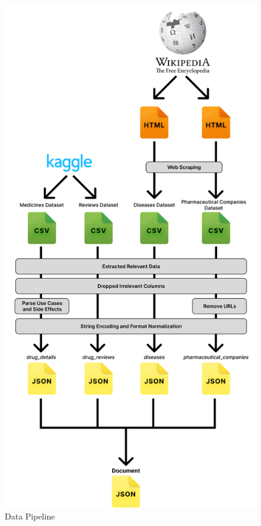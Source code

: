 \documentclass[sigconf]{acmart}
\begin{document}
\begin{figure}[h]
	\centering
	\includegraphics[width=\linewidth]{data_pipeline.png}
	\caption{Data Pipeline}
	\label{fig:pipeline}
  \end{figure}
\end{document}
